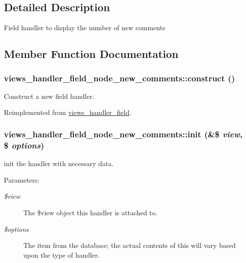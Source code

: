 \subsection{Detailed Description}
Field handler to display the number of new comments 

\subsection{Member Function Documentation}
\hypertarget{classviews__handler__field__node__new__comments_a496a5184a390c29a60e0dc7d16c23e5}{
\subsubsection[{construct}]{\setlength{\rightskip}{0pt plus 5cm}views\_\-handler\_\-field\_\-node\_\-new\_\-comments::construct ()}}
\label{classviews__handler__field__node__new__comments_a496a5184a390c29a60e0dc7d16c23e5}


Construct a new field handler. 

Reimplemented from \hyperlink{classviews__handler__field_3d50050864c255b71c842972a45d39f6}{views\_\-handler\_\-field}.\hypertarget{classviews__handler__field__node__new__comments_8f93300640b88efd9401dc2666fcc64a}{
\subsubsection[{init}]{\setlength{\rightskip}{0pt plus 5cm}views\_\-handler\_\-field\_\-node\_\-new\_\-comments::init (\&\$ {\em view}, \/  \$ {\em options})}}
\label{classviews__handler__field__node__new__comments_8f93300640b88efd9401dc2666fcc64a}


init the handler with necessary data. \begin{Desc}
\item[Parameters:]
\begin{description}
\item[{\em \$view}]The \$view object this handler is attached to. \item[{\em \$options}]The item from the database; the actual contents of this will vary based upon the type of handler. \end{description}
\end{Desc}


